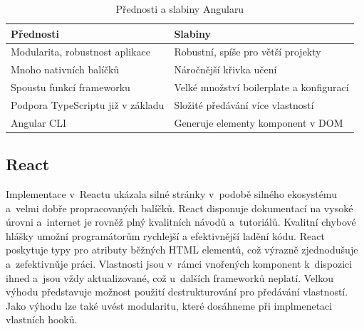 \begin{table}[htb]
	\centering
	\caption{Přednosti a slabiny Angularu}
	\medskip
	\radkovani[1.2]
		\begin{tabular}{|l|l|}
		\hline
		\textbf{Přednosti}									& \textbf{Slabiny}                    			\\ \hline
		Modularita, robustnost aplikace			& Robustní, spíše pro větší projekty				\\ \hline
		Mnoho nativních balíčků							& Náročnější křivka učení										\\ \hline
		Spoustu funkcí frameworku						& Velké množství boilerplate a konfigurací	\\ \hline
		Podpora TypeScriptu již v základu		& Složité předávání více vlastností					\\ \hline
		Angular CLI													& Generuje elementy komponent v DOM					\\ \hline
		\end{tabular}
	\label{tab:angulartabulka}
\end{table}


\subsection*{React}

Implementace v~Reactu ukázala silné stránky v~podobě silného ekosystému a~velmi dobře propracovaných balíčků. 
React disponuje dokumentací na vysoké úrovni a~internet je rovněž plný kvalitních návodů a~tutoriálů. 
Kvalitní chybové hlášky umožní programátorům rychlejší a efektivnější ladění kódu. 
React poskytuje typy pro atributy běžných HTML elementů, což výrazně zjednodušuje a~zefektivnǔje práci. 
Vlastnosti jsou v~rámci vnořených komponent k~dispozici ihned a~jsou vždy aktualizované, což u~dalších frameworků neplatí. 
Velkou výhodu představuje možnost použití destrukturování pro předávání vlastností. 
Jako výhodu lze také uvést modularitu, které dosáhneme při implmenetaci vlastních hooků. 

